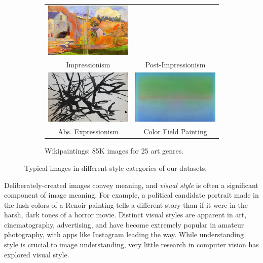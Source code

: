 \begin{figure}[t]
{\begin{subfigure}[t]{0.48\linewidth}
\begin{tabular}{cc}
        \includegraphics[width=.43\linewidth]{../style/figures/wikipaintingsDatasetExamples/used/resized/post_impressionism-0.jpg} \\
    Impressionism & Post-Impressionism \\
        \includegraphics[width=.43\linewidth]{../style/figures/wikipaintingsDatasetExamples/used/resized/abs_expressionism-0.jpg} &
    \includegraphics[width=.43\linewidth]{../style/figures/wikipaintingsDatasetExamples/used/resized/color_field-0.jpg} \\
    Abs. Expressionism & Color Field Painting \\
    \end{tabular}
    \caption{
        Wikipaintings: 85K images for 25 art genres.
    }\label{fig:wikipaintings_style_examples}
\end{subfigure}
}
\caption{
    Typical images in different style categories of our datasets.
}\label{fig:style_examples}
\end{figure}

Deliberately-created images convey meaning, and \textit{visual style} is often a significant component of image meaning.
For example, a political candidate portrait made in the lush colors of a Renoir painting tells a different story than if it were in the harsh, dark tones of a horror movie.
Distinct visual styles are apparent in art, cinematography, advertising, and have become extremely popular in amateur photography, with apps like Instagram leading the way.
While understanding style is crucial to image understanding, very little research in computer vision has explored visual style.

